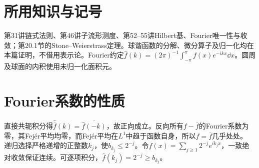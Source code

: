 \documentclass[UTF8,fontset=fandol,11pt]{ctexart}
\begin{document}
\section*{所用知识与记号}
第31讲链式法则、第46讲子流形测度、第52--55讲Hilbert基、Fourier唯一性与收敛；第20.1节的Stone--Weierstrass定理。球谐函数的分解、微分算子及归一化均在本篇证明，不借用表示论。Fourier约定$\widehat f(k)=(2\pi)^{-1}\int_{-\pi}^{\pi}f(x)e^{-ikx}\dd x$。圆周及球面的内积使用未归一化面积元。
\section{Fourier系数的性质}
直接共轭积分得$\widehat{\overline f}(k)=\overline{\widehat f(-k)}$，故正向成立。反向所有$f-\overline f$的Fourier系数为零，其Fejér平均均零，而Fejér平均在$L^1$中趋于函数自身，所以$f=\overline f$几乎处处。
递归选择严格递增的正整数$k_j$，使$b_{k_j}\le2^{-j}$。令$f(x)=\sum_{j\ge1}2^{-j}e^{ik_jx}$，一致绝对收敛保证连续。可逐项积分，$\widehat f(k_j)=2^{-j}\ge b_{k_j}$。
\end{document}
